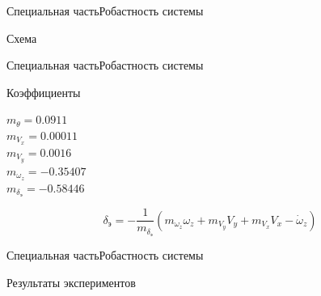 \begin{frame}{Специальная часть}{Робастность системы}
    \begin{block}{Схема}
    \end{block}
\end{frame}
 
\begin{frame}{Специальная часть}{Робастность системы}
    \begin{block}{Коэффициенты}
        \begin{center}
    $m_\theta = 0.0911$ \\
    $m_{V_x} = 0.00011$ \\ 
    $m_{V_y} = 0.0016$ \\ 
    $m_{\omega_z} = -0.35407$ \\ 
    $m_{\delta_\text{э}} = -0.58446$ \\ 
        \end{center}
    \end{block}
    $$\delta_\text{э}= -\frac{1}{m_{\delta_\text{э}}} (m_{\omega_z} \omega_z + m_{V_y} V_y + m_{V_x} V_x - \dot{\omega}_z)$$ 
\end{frame}

\begin{frame}{Специальная часть}{Робастность системы}
    \begin{block}{Результаты экспериментов}
    \end{block}
\end{frame}

